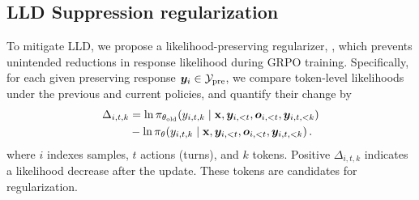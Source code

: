 \subsection{LLD Suppression regularization}
To mitigate LLD, we propose a likelihood-preserving regularizer, \ours, which prevents unintended reductions in response likelihood during GRPO training. Specifically, for each given preserving response $\bm{y}_i \in \mathcal{Y}_{\rm pre}$, we compare token-level likelihoods under the previous and current policies, and quantify their change by
\begin{align}
    \Delta_{i,t,k}
&=
\ln \pi_{\theta_{\mathrm{old}}}\!\left(y_{i,t,k}\mid \mathbf{x},\bm{y}_{i,<t},\bm{o}_{i,<t},\bm{y}_{i,t,<k}\right)
\notag \\ &-
\ln \pi_{\theta}\!\left(y_{i,t,k}\mid \mathbf{x},\bm{y}_{i,<t},\bm{o}_{i,<t},\bm{y}_{i,t,<k}\right).
\notag 
\end{align}
where $i$ indexes samples, $t$ actions (turns), and $k$ tokens. Positive $\Delta_{i,t,k}$ indicates a likelihood decrease after the update. These tokens are candidates for regularization.
